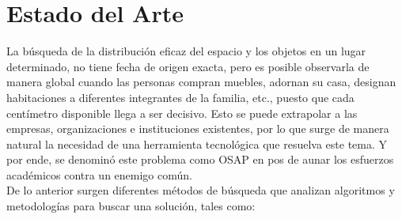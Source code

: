 \documentclass[letter, 10pt]{article}
\begin{document}
\section{Estado del Arte}

La b\'usqueda de la distribuci\'on eficaz del espacio y los objetos en un lugar determinado, no tiene fecha de origen exacta, 
pero es posible observarla de manera global cuando las personas compran muebles, adornan su casa, designan habitaciones a diferentes integrantes de la familia, etc., puesto que cada cent\'imetro disponible llega a ser decisivo. Esto se puede extrapolar a las empresas, organizaciones e instituciones existentes, por lo que surge de manera natural la necesidad de una herramienta tecnol\'ogica que resuelva este tema. Y por ende, se denomin\'o este problema como OSAP en pos de aunar los esfuerzos acad\'emicos contra un enemigo com\'un. \\
De lo anterior surgen diferentes m\'etodos de b\'usqueda que analizan algoritmos y metodolog\'ias para buscar una soluci\'on, tales como:
\end{document}
